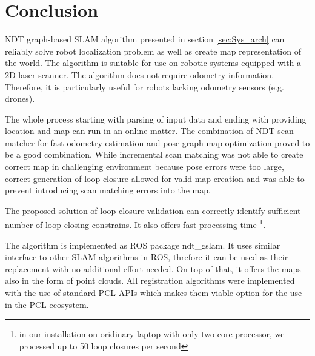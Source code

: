 \chapter*{Conclusion}
\gls{NDT} graph-based \gls{SLAM} algorithm presented in section \ref{sec:Sys_arch} can reliably solve robot localization problem as well as create map representation of the world.  The algorithm is suitable for use on robotic systems equipped with a 2D laser scanner. The algorithm does not require odometry information. Therefore, it is particularly useful for robots lacking odometry sensors (e.g. drones). 

The whole process starting with parsing of input data and ending with providing location and map can run in an online matter. The combination of \gls{NDT} scan matcher for fast odometry estimation and pose graph map optimization proved to be a good combination. While incremental scan matching was not able to create correct map in challenging environment because pose errors were too large, correct generation of loop closure allowed for valid map creation and was able to prevent introducing scan matching errors into the map. 

The proposed solution of loop closure validation can correctly identify sufficient number of loop closing constrains. It also offers fast processing time \footnote{in our installation on oridinary laptop with only two-core processor, we processed up to 50 loop closures per second}. 

The algorithm is implemented as ROS package ndt\_gslam. It uses similar interface to other SLAM algorithms in \gls{ROS}, threfore it can be used as their replacement with no additional effort needed. On top of that, it offers the maps also in the form of point clouds. All registration algorithms were implemented with the use of standard \gls{PCL} APIs which makes them viable option for the use in the \gls{PCL} ecosystem.  
